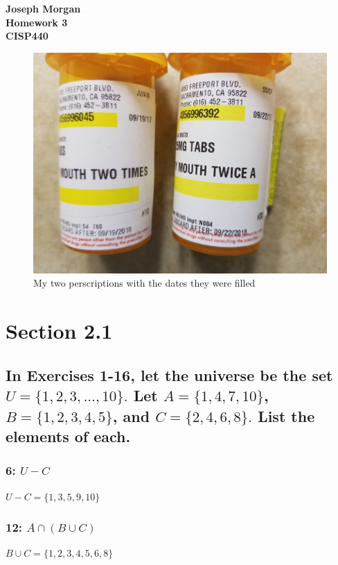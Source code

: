 \documentclass[12pt,titlepage]{article}
\begin{document}
\begin{titlepage}
	\centering
	\vfill
	{\bfseries\Large
		Joseph Morgan\\
		\large
		Homework 3\\
		\vskip2cm
		CISP440\\
	}
	\vfill
	\vfill
	\vfill
	\begin{figure}[h]
		\caption{My two perscriptions with the dates they were filled}
		\centering
		\includegraphics[width=160mm]{proof.jpg}
	\end{figure}
\end{titlepage}
\section*{Section 2.1}
\subsection*{In Exercises 1-16, let the universe be the set $U = \{1, 2, 3, ..., 10\}.$ Let $A = \{1, 4, 7, 10\}$, $B = \{1, 2, 3, 4, 5\}$, and $C = \{2, 4, 6, 8\}.$ List the elements of each.}
\subsubsection*{6: $U - C$}

$U - C = \{1, 3, 5, 9, 10\}$
\subsubsection*{12: $A \cap (B \cup C)$}

$B \cup C = \{1, 2, 3, 4, 5, 6, 8\}$
\end{document}
